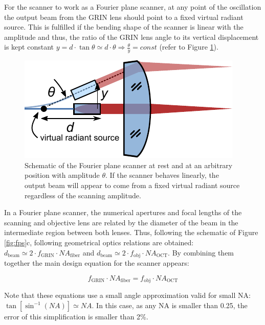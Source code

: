 For the scanner to work as a Fourier plane scanner, at any point of the oscillation the output beam from the GRIN lens should point to a fixed virtual radiant source. This is fulfilled if the bending shape of the scanner is linear with the amplitude and thus, the ratio of the GRIN lens angle to its vertical displacement is kept constant $ y = d \cdot \tan \theta \simeq d \cdot \theta \Rightarrow \frac{\theta}{y} = const $ (refer to Figure \ref{fig:radiant}).

\begin{figure}[h!]\centering
      \includegraphics{figures/30_DesignSimulation/Mechanical/radiant.pdf}
      \caption{Schematic of the Fourier plane scanner at rest and at an arbitrary position with amplitude $\theta$. If the scanner behaves linearly, the output beam will appear to come from a fixed virtual radiant source regardless of the scanning amplitude.}
      \label{fig:radiant}
\end{figure}


In a Fourier plane scanner, the numerical apertures and focal lengths of the scanning and objective lens are related by the diameter of the beam in the intermediate region between both lenses. Thus, following the schematic of Figure \ref{fig:fps}c, following geometrical optics relations are obtained: $d_\mathrm{beam} \simeq 2\cdot f_\mathrm{GRIN}\cdot \mathit{NA}_\mathrm{fiber}$ and $d_\mathrm{beam} \simeq 2 \cdot f_\mathrm{obj}\cdot \mathit{NA}_\mathrm{OCT}$. By combining them together the main design equation for the scanner appears:

\begin{equation}
f_\mathrm{GRIN} \cdot \mathit{NA}_\mathrm{fiber} = f_\mathrm{obj} \cdot \mathit{NA}_\mathrm{OCT}
\label{eq:fpsNA}
\end{equation}

Note that these equations use a small angle approximation valid for small NA: \\ $\tan[	\sin^{-1}(\mathit{NA})] \simeq \mathit{NA} $. In this case, as any NA is smaller than 0.25, the error of this simplification is smaller than 2\%.

